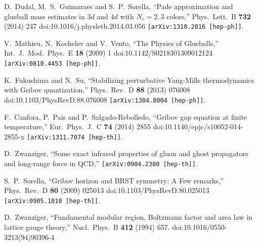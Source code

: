 \documentclass[a4paper,11pt,british,twosides]{book}%
\numberwithin{equation}{section}
\begin{document}
\begin{thebibliography}{9}
  D.~Dudal, M.~S.~Guimaraes and S.~P.~Sorella,
  ``Pade approximation and glueball mass estimates in $3d$ and $4d$ with $N_c=2,3$ colors,''
  Phys.\ Lett.\ B {\bf 732} (2014) 247
  doi:10.1016/j.physletb.2014.03.056
  {\tt [arXiv:1310.2016 [hep-ph]]}.


  V.~Mathieu, N.~Kochelev and V.~Vento,
  ``The Physics of Glueballs,''
  Int.\ J.\ Mod.\ Phys.\ E {\bf 18} (2009) 1
  doi:10.1142/S0218301309012124
  {\tt [arXiv:0810.4453 [hep-ph]]}.


  K.~Fukushima and N.~Su,
  ``Stabilizing perturbative Yang-Mills thermodynamics with Gribov quantization,''
  Phys.\ Rev.\ D {\bf 88} (2013) 076008
  doi:10.1103/PhysRevD.88.076008
  {\tt [arXiv:1304.8004 [hep-ph]]}.

  F.~Canfora, P.~Pais and P.~Salgado-Rebolledo,
  ``Gribov gap equation at finite temperature,''
  Eur.\ Phys.\ J.\ C {\bf 74} (2014) 2855
  doi:10.1140/epjc/s10052-014-2855-x
  {\tt [arXiv:1311.7074 [hep-th]]}.

  D.~Zwanziger,
  ``Some exact infrared properties of gluon and ghost propagators and long-range force in
  QCD,''
  {\tt [arXiv:0904.2380 [hep-th]]}.

  S.~P.~Sorella,
  ``Gribov horizon and BRST symmetry: A Few remarks,''
  Phys.\ Rev.\ D {\bf 80} (2009) 025013
  doi:10.1103/PhysRevD.80.025013
  {\tt [arXiv:0905.1010 [hep-th]]}.

  D.~Zwanziger,
  ``Fundamental modular region, Boltzmann factor and area law in lattice gauge theory,''
  Nucl.\ Phys.\ B {\bf 412} (1994) 657.
  doi:10.1016/0550-3213(94)90396-4


\end{thebibliography}
\end{document}
